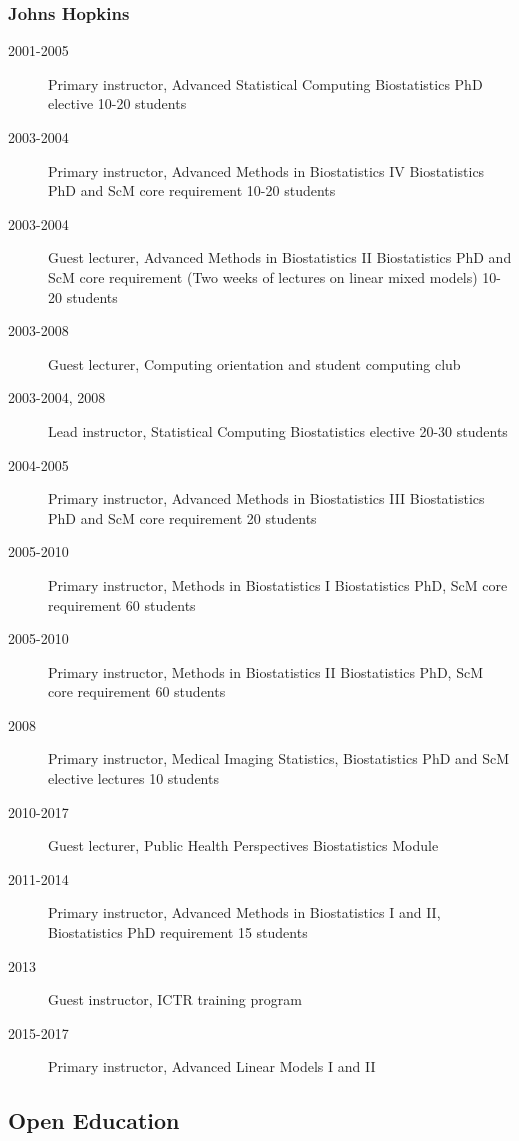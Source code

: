 \documentclass[12pt]{article}
\begin{document}
\subsubsection*{Johns Hopkins} 
\begin{description}
\item[\textnormal{2001-2005}] Primary instructor, Advanced Statistical Computing  Biostatistics PhD elective 10-20 students 
\item[\textnormal{2003-2004}] Primary instructor, Advanced Methods in Biostatistics IV Biostatistics PhD and ScM core requirement 10-20 students 
\item[\textnormal{2003-2004}] Guest lecturer, Advanced Methods in Biostatistics II
Biostatistics PhD and ScM core requirement (Two weeks of lectures on linear mixed models) 10-20 students 
\item[\textnormal{2003-2008}] Guest lecturer, Computing orientation and student computing club 
\item[\textnormal{2003-2004, 2008}] Lead instructor, Statistical Computing Biostatistics elective 20-30 students
\item[\textnormal{2004-2005}] Primary instructor, Advanced Methods in Biostatistics III 
Biostatistics PhD and ScM core requirement 20 students 
\item[\textnormal{2005-2010}] Primary instructor, Methods in Biostatistics  I 
Biostatistics PhD, ScM core requirement  60 students 
\item[\textnormal{2005-2010}] Primary instructor, Methods in Biostatistics II
  Biostatistics PhD, ScM core requirement 60 students
\item[\textnormal{2008}]  Primary instructor, Medical Imaging Statistics, Biostatistics PhD and ScM elective lectures 10 students 
\item[\textnormal{2010-2017}] Guest lecturer, Public Health Perspectives Biostatistics Module
\item[\textnormal{2011-2014}] Primary instructor, Advanced Methods in Biostatistics I and II,
Biostatistics PhD requirement 15 students
\item[\textnormal{2013}] Guest instructor, ICTR training program
\item[\textnormal{2015-2017}] Primary instructor, Advanced Linear Models I and II
\end{description}

\subsection*{Open Education}
\end{document}
